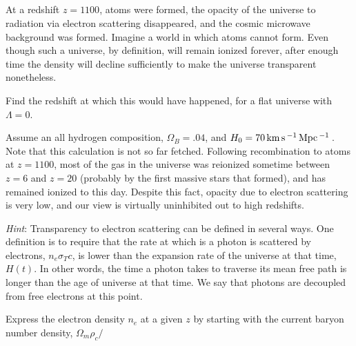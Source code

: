 \documentclass[12pt]{article}
\begin{document}
\subsection{} %

At a redshift \(z = 1100\), atoms were formed, the opacity of the universe to radiation via electron scattering disappeared, and the cosmic microwave background was formed. Imagine a world in which atoms cannot form. Even though such a universe, by definition, will remain ionized forever, after enough time the density will decline sufficiently to make the universe transparent nonetheless.

Find the redshift at which this would have happened, for a flat universe with \(\Lambda=0\).

Assume an all hydrogen composition, \(\Omega_B = .04\), and \(H_0 = 70\,\mathrm{km\,}\mathrm{s}\,^{-1}\,\mathrm{Mpc}\,^{-1}\,\). Note that this calculation is not so far fetched. Following recombination to atoms at \(z=1100\), most of the gas in the universe was reionized sometime between \(z=6\) and \(z=20\) (probably by the first massive stars that formed), and has remained ionized to this day. Despite this fact, opacity due to electron scattering is very low, and our view is virtually uninhibited out to high redshifts.

\textit{Hint}: Transparency to electron scattering can be defined in several ways. One definition is to require that the rate at which is a photon is scattered by electrons, \(n_e\sigma_T c\), is lower than the expansion rate of the universe at that time, \(H(t)\). In other words, the time a photon takes to traverse its mean free path is longer than the age of universe at that time. We say that photons are decoupled from free electrons at this point.

Express the electron density \(n_e\) at a given \(z\) by starting with the current baryon number density, \(\Omega_m \rho_c /\) 
\end{document}
